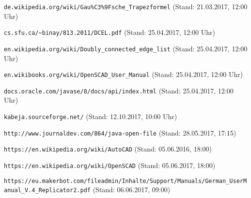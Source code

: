 \begin{thebibliography}{9}
			\verb|de.wikipedia.org/wiki/Gau%C3%9Fsche_Trapezformel| (Stand: 21.03.2017, 12:00 Uhr)
		
		 \verb|cs.sfu.ca/~binay/813.2011/DCEL.pdf| (Stand: 25.04.2017, 12:00 Uhr)

		 \verb|en.wikipedia.org/wiki/Doubly_connected_edge_list| (Stand: 25.04.2017, 12:00 Uhr)
		
		 \verb|en.wikibooks.org/wiki/OpenSCAD_User_Manual| (Stand: 25.04.2017, 12:00 Uhr)
		
		 \verb|docs.oracle.com/javase/8/docs/api/index.html| (Stand: 25.04.2017, 12:00 Uhr)
		
		 \verb|kabeja.sourceforge.net/| (Stand: 12.10.2017, 10:00 Uhr)
		
		 \verb|http://www.journaldev.com/864/java-open-file| (Stand: 28.05.2017, 17:15)
		 
		 \verb|https://en.wikipedia.org/wiki/AutoCAD| (Stand: 05.06.2016, 18:00)
		 
		 \verb|https://en.wikipedia.org/wiki/OpenSCAD| (Stand: 05.06.2017, 18:00)
		 
		 \verb|https://eu.makerbot.com/fileadmin/Inhalte/Support/Manuals/German_UserManual_V.4_Replicator2.pdf| (Stand: 06.06.2017, 09:00)
	
\end{thebibliography}